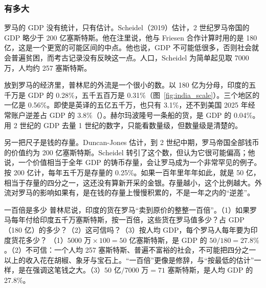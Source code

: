 \subsubsection{有多大}
罗马的 GDP 没有统计，只有估计。Scheidel（2019）估计，2 世纪罗马帝国的 GDP 略少于 200 亿塞斯特斯。他在注里说，他与 Friesen 合作计算时用的是 180 亿，这是一个更宽的可能区间的中点。他也说，GDP 不可能低很多，否则社会就会普遍贫困，而考古记录没有反映这一点\cite{scheidel2019}。人口，Scheidel 为简单起见取 7000 万\cite{scheidel2019}，人均约 257 塞斯特斯。

放到罗马的经济里，普林尼的外流是一个很小的数。以 180 亿为分母，印度的五千万是 GDP 的 0.28\%，五千五百万是 0.31\%（图~\ref{fig:india_scale}）。三个地区的一亿是 0.56\%。即使是英译的五亿五千万，也只有 3.1\%，还不到美国 2025 年经常账户逆差占 GDP 的 3.8\%（）\cite{wdi2026}。赫尔玛波隆号一条船的货，是 GDP 的 0.04\%。用 2 世纪的 GDP 去量 1 世纪的数字，只能看数量级，但数量级是清楚的。

另一把尺子是钱的存量。Duncan-Jones 估计，到 2 世纪中期，罗马帝国全部钱币的价值约为 200 亿塞斯特斯。Scheidel 转引了这个数，但认为它很可能偏高；他说，一个价值相当于全年 GDP 的铸币存量，会让罗马成为一个非常罕见的例子\cite{scheidel2019}。按 200 亿计，每年五千万是存量的 0.25\%。如果一百年里年年如此，就是 50 亿，相当于存量的四分之一，这还没有算新开采的金银。存量越小，这个比例越大。外流对罗马的影响如果有，是在钱的存量上慢慢积累的，不是一年之内的“逆差”。

\begin{example}{一百倍是多少}\label{ex:india-scale}
普林尼说，印度的货在罗马“卖到原价的整整一百倍”。（1）如果罗马每年付给印度五千万塞斯特斯，按一百倍，这些货在罗马值多少？占 GDP（180 亿）的多少？（2）这可信吗？（3）按人均 GDP，每个罗马人每年要为印度货花多少？
\solution （1）$5000\text{ 万}\times100=50$ 亿塞斯特斯，是 GDP 的 $50/180=27.8\%$。（2）不可信：一个人均 257 塞斯特斯、普遍不富裕的社会，不可能把四分之一以上的收入花在胡椒、象牙与宝石上。“一百倍”更像是修辞，与“按最低的估计”一样，是在强调这笔钱之大。（3）$50\text{ 亿}/7000\text{ 万}=71$ 塞斯特斯，是人均 GDP 的 27.8\%。
\end{example}


